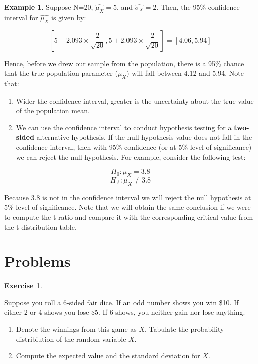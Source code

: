 \documentclass[
]{book}
\theoremstyle{definition}
\theoremstyle{definition}
\newtheorem{example}{Example}[chapter]
\theoremstyle{definition}
\newtheorem{exercise}{Exercise}[chapter]
\theoremstyle{definition}
\theoremstyle{remark}
\begin{document}
\begin{example}
\protect\hypertarget{exm:unnamed-chunk-98}{}\label{exm:unnamed-chunk-98}Suppose N=20, \(\hat{\mu_X}=5\), and \(\hat{\sigma_X}=2\). Then, the 95\% confidence interval for \(\hat{\mu_X}\) is given by:

\[\left[5-2.093 \times \frac{2}{\sqrt{20}}, 5+2.093 \times \frac{2}{\sqrt{20}} \right]=[4.06,5.94]\]

Hence, before we drew our sample from the population, there is a 95\% chance that the true population parameter (\(\mu_X\)) will fall between 4.12 and 5.94. Note that:

\begin{enumerate}
\def\labelenumi{\arabic{enumi}.}
\item
  Wider the confidence interval, greater is the uncertainty about the true value of the population mean.
\item
  We can use the confidence interval to conduct hypothesis testing for a \textbf{two-sided} alternative hypothesis. If the null hypothesis value does not fall in the confidence interval, then with 95\% confidence (or at 5\% level of significance) we can reject the null hypothesis. For example, consider the following test:
\end{enumerate}

\[H_0: \mu_X=3.8\]
\[H_A: \mu_X\neq 3.8\]

Because 3.8 is not in the confidence interval we will reject the null hypothesis at 5\% level of significance. Note that we will obtain the same conclusion if we were to compute the t-ratio and compare it with the corresponding critical value from the t-distribution table.
\end{example}

\hypertarget{problems-7}{%
\section*{Problems}\label{problems-7}}

\begin{exercise}
\protect\hypertarget{exr:unnamed-chunk-99}{}\label{exr:unnamed-chunk-99}

Suppose you roll a 6-sided fair dice. If an odd number shows you win \$10. If either 2 or 4 shows you lose \$5. If 6 shows, you neither gain nor lose anything.

\begin{enumerate}
\def\labelenumi{\alph{enumi}.}
\item
  Denote the winnings from this game as \(X\). Tabulate the probability distribiution of the random variable \(X\).
\item
  Compute the expected value and the standard deviation for \(X\).
\end{enumerate}

\end{exercise}
\end{document}
